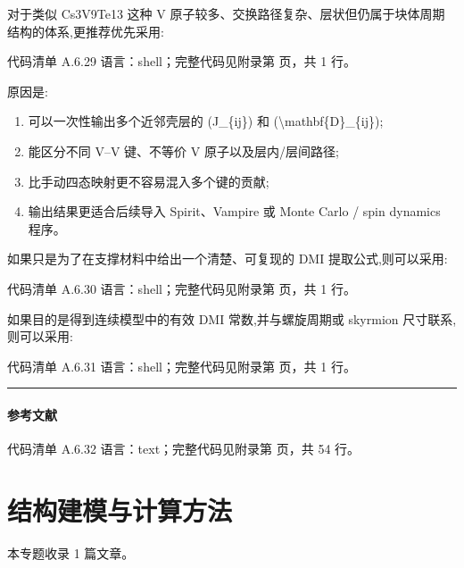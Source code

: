 \documentclass[lang=cn,scheme=chinese,color=blue,device=normal,toc=onecol,math=cm]{elegantbook}
\begin{document}
对于类似 Cs3V9Te13 这种 V 原子较多、交换路径复杂、层状但仍属于块体周期结构的体系,更推荐优先采用:\par


\begin{codeindexbox}{代码清单 A.6.29}
语言：shell；完整代码见附录第 \pageref{code:6:29} 页，共 1 行。
\end{codeindexbox}


原因是:\par


\begin{enumerate}
\item 可以一次性输出多个近邻壳层的 (J\_\allowbreak{}\{ij\}) 和 (\textbackslash{}\allowbreak{}mathbf\{D\}\_\allowbreak{}\{ij\});
\item 能区分不同 V–V 键、不等价 V 原子以及层内/\allowbreak{}层间路径;
\item 比手动四态映射更不容易混入多个键的贡献;
\item 输出结果更适合后续导入 Spirit、Vampire 或 Monte Carlo /\allowbreak{} spin dynamics 程序。
\end{enumerate}


如果只是为了在支撑材料中给出一个清楚、可复现的 DMI 提取公式,则可以采用:\par


\begin{codeindexbox}{代码清单 A.6.30}
语言：shell；完整代码见附录第 \pageref{code:6:30} 页，共 1 行。
\end{codeindexbox}


如果目的是得到连续模型中的有效 DMI 常数,并与螺旋周期或 skyrmion 尺寸联系,则可以采用:\par


\begin{codeindexbox}{代码清单 A.6.31}
语言：shell；完整代码见附录第 \pageref{code:6:31} 页，共 1 行。
\end{codeindexbox}


\medskip\hrule\medskip


\subsubsection{参考文献}


\begin{codeindexbox}{代码清单 A.6.32}
语言：text；完整代码见附录第 \pageref{code:6:32} 页，共 54 行。
\end{codeindexbox}


\chapter{结构建模与计算方法}
\begin{partbox}本专题收录 1 篇文章。\end{partbox}
\end{document}
